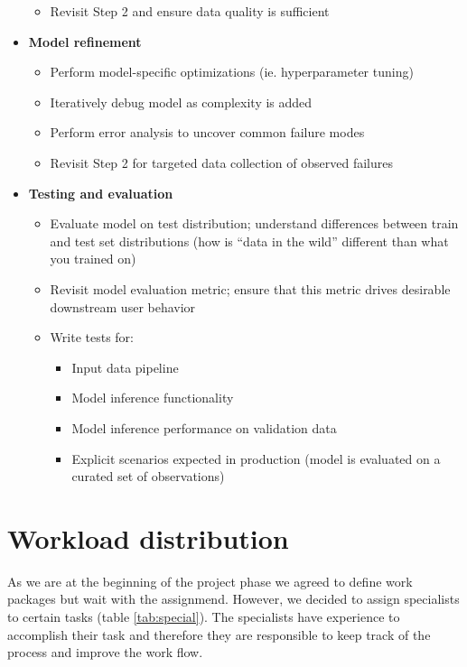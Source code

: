 \documentclass[lang=english,inputenc=utf8,fontsize=10pt]{ldvarticle}
\begin{document}
\begin{itemize}
\begin{itemize}
        \item Revisit Step 2 and ensure data quality is sufficient
    \end{itemize}
    \item \textbf{Model refinement}
    \begin{itemize}
        \item Perform model-specific optimizations (ie. hyperparameter tuning)
        \item Iteratively debug model as complexity is added
        \item Perform error analysis to uncover common failure modes
        \item Revisit Step 2 for targeted data collection of observed failures
    \end{itemize}
    \item \textbf{Testing and evaluation}
    \begin{itemize}
        \item Evaluate model on test distribution; understand differences between train and test set distributions (how is “data in the wild” different than what you trained on)
        \item Revisit model evaluation metric; ensure that this metric drives desirable downstream user behavior
        \item Write tests for:
        \begin{itemize}
            \item Input data pipeline
            \item Model inference functionality
            \item Model inference performance on validation data
            \item Explicit scenarios expected in production (model is evaluated on a curated set of observations)
        \end{itemize}
    \end{itemize}
\end{itemize}

\section{Workload distribution}
As we are at the beginning of the project phase we agreed to define work packages but wait with the assignmend. However, we decided to assign specialists to certain tasks (table \ref{tab:special}). The specialists have experience to accomplish their task and therefore they are responsible to keep track of the process and improve the work flow.\\
\end{document}
